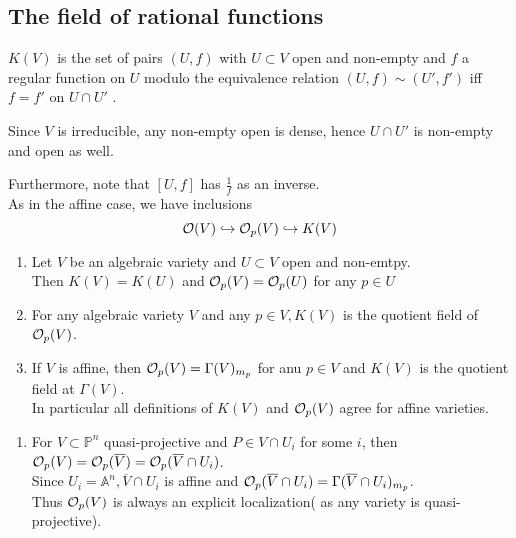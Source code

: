 \documentclass[../main.tex]{subfiles}
\begin{document}
\subsection{The field of rational functions}
\begin{defn}
	$K( V) $ is the set of pairs $ ( U,f) $ with $U \subset V$ open and non-empty and $f$ a regular function on $U$ modulo the equivalence relation $( U,f) \sim ( U',f') $  iff $f=f'$ on $U\cap U'$ .
\end{defn}
\begin{rmq}
Since $V$ is irreducible, any non-empty open is dense, hence $U\cap U'$ is non-empty and open as well.\\
\end{rmq}
Furthermore, note that $ [U,f ] $ has $\frac{1}{f}$ as an inverse.\\
As in the affine case, we have inclusions
\[ 
\mathcal{O}( V) \hookrightarrow \mathcal{O}_p( V) \hookrightarrow K( V) 
\]
\begin{propo}
\begin{enumerate}
\item Let $V$ be an algebraic variety and $U \subset V$ open and non-emtpy.\\
Then $K( V) = K( U) $ and $ \mathcal{O}_p( V) = \mathcal{O}_p( U) $ for any $ p\in U$ 
\item For any algebraic variety $V$ and any $p\in V, K( V) $ is the quotient field of $\mathcal{O}_p( V) $.
\item If $V$ is affine, then $\mathcal{O}_p( V) = \Gamma( V) _{m_p} $ for anu $p\in V$ and $K( V) $ is the quotient field at $\Gamma( V) $.\\
	In particular all definitions of $K( V) $ and $\mathcal{O}_p( V) $ agree for affine varieties.
\end{enumerate}
\end{propo}
\begin{rmq}
\begin{enumerate}
\item For $V \subset \mathbb{P}^{n}$ quasi-projective and $P\in V\cap U_i$ for some $i$, then $\mathcal{O}_p( V) = \mathcal{O}_p( \overline{V}) = \mathcal{O}_p( \overline{V}\cap U_i) $.\\
	Since $U_i = \mathbb{A}^{n}, \overline{V}\cap U_i$ is affine and $\mathcal{O}_p( \overline{V}\cap U_i) = \Gamma( \overline{V}\cap U_i) _{m_p} $.\\
	Thus $\mathcal{O}_p( V) $ is always an explicit localization( as any variety is quasi-projective). 
\end{enumerate}
\end{rmq}
\end{document}
